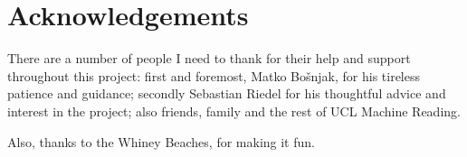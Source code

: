 \chapter*{Acknowledgements}


There are a number of people I need to thank for their help and support throughout this project: first and foremost, Matko Bo\v{s}njak, for his tireless patience and guidance; secondly Sebastian Riedel for his thoughtful advice and interest in the project; also friends, family and the rest of UCL Machine Reading. 

Also, thanks to the Whiney Beaches, for making it fun.

